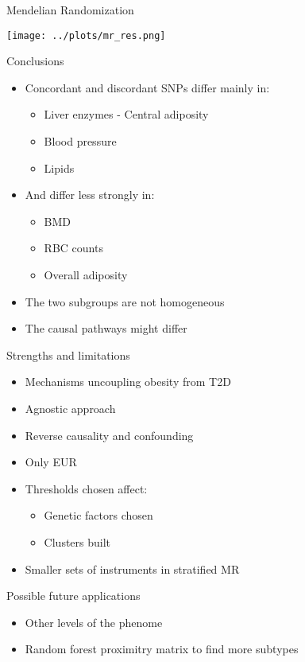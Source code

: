 \documentclass[presentation]{beamer}
\begin{document}
\begin{frame}[label={sec:orgfbb1240}]{Mendelian Randomization}
\begin{center}
\texttt{[image: ../plots/mr\_res.png]}
\end{center}
\end{frame}
\begin{frame}[label={sec:org1c88e37}]{Conclusions}
\begin{itemize}
\item Concordant and discordant SNPs differ mainly in:
\begin{itemize}
\item Liver enzymes - Central adiposity
\item Blood pressure
\item Lipids
\end{itemize}
\item And differ less strongly in:
\begin{itemize}
\item BMD
\item RBC counts
\item Overall adiposity
\end{itemize}
\item The two subgroups are not homogeneous
\item The causal pathways might differ
\end{itemize}
\end{frame}
\begin{frame}[label={sec:org98c8d5b}]{Strengths and limitations}
\begin{itemize}
\item Mechanisms uncoupling obesity from T2D
\item Agnostic approach
\item Reverse causality and confounding
\item Only EUR
\item Thresholds chosen affect:
\begin{itemize}
\item Genetic factors chosen
\item Clusters built
\end{itemize}
\item Smaller sets of instruments in stratified MR
\end{itemize}
\end{frame}
\begin{frame}[label={sec:orgb88cfe6}]{Possible future applications}
\begin{itemize}
\item Other levels of the phenome
\item Random forest proximitry matrix to find more subtypes
\end{itemize}
\end{frame}
\end{document}
